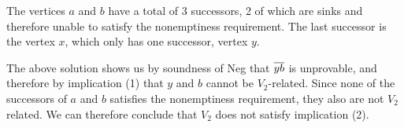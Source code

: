 The vertices $a$ and $b$ have a total of 3 successors, 2 of which are sinks and therefore unable to satisfy the nonemptiness requirement.
The last successor is the vertex $x$, which only has one successor, vertex $y$.\par
\begin{figure}[!h]
  \centering
  \caption{}
  \label{fig:v2_counter_assignment}
\end{figure}
The above solution shows us by soundness of Neg that $\ol{yb}$ is unprovable, and therefore by implication (1) that $y$ and $b$ cannot be $V_2$-related.
Since none of the successors of $a$ and $b$ satisfies the nonemptiness requirement, they also are not $V_2$ related.
We can therefore conclude that $V_2$ does not satisfy implication (2).
